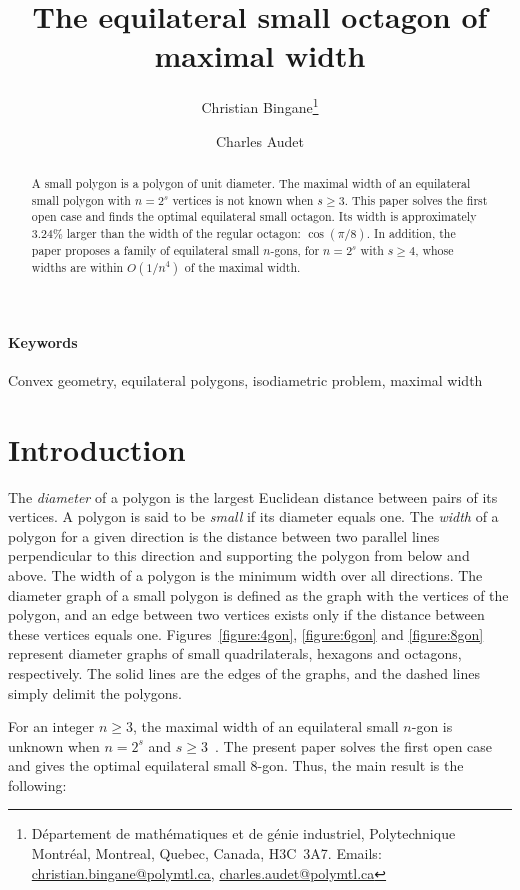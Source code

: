 \documentclass[a4paper,12pt]{article}
\title{The equilateral small octagon of maximal width}
\author{Christian Bingane\thanks{D\'{e}partement de math\'{e}matiques et de g\'{e}nie industriel, Polytechnique Montr\'{e}al, Montreal, Quebec, Canada, H3C~3A7. Emails: \url{christian.bingane@polymtl.ca}, \url{charles.audet@polymtl.ca}} \and Charles Audet\footnotemark[1]}
\theoremstyle{definition}
\theoremstyle{plain}
\begin{document}
\maketitle
\begin{abstract}
A small polygon is a polygon of unit diameter. The maximal width of an equilateral small polygon with $n=2^s$ vertices is not known when $s \ge 3$. This paper solves the first open case and finds the optimal equilateral small octagon. Its width is approximately $3.24\%$ larger than the width of the regular octagon: $\cos(\pi/8)$. In addition, the paper proposes a family of equilateral small $n$-gons, for $n=2^s$ with $s\ge 4$, whose widths are within $O(1/n^4)$ of the maximal width.
\end{abstract}
\paragraph{Keywords} Convex geometry, equilateral polygons, isodiametric problem, maximal width


\section{Introduction}
The {\em diameter} of a polygon is the largest Euclidean distance between pairs of its vertices. A polygon is said to be {\em small} if its diameter equals one. The {\em width}­ of a polygon for a given direction is the distance between two parallel lines perpendicular to this direction and supporting the polygon from below and above. The width of a polygon is the minimum width over all directions. The diameter graph of a small polygon is defined as the graph with the vertices of the polygon, and an edge between two vertices exists only if the distance between these vertices equals one. Figures~\ref{figure:4gon}, \ref{figure:6gon} and \ref{figure:8gon} represent diameter graphs of small quadrilaterals, hexagons and octagons, respectively. The solid lines are the edges of the graphs, and the dashed lines simply delimit the polygons.

For an integer $n \ge 3$, the maximal width of an equilateral small $n$-gon is unknown when $n = 2^s$ and $s \ge 3$~\cite{bezdek2000}. The present paper solves the first open case and gives the optimal equilateral small $8$-gon. Thus, the main result is the following:
\end{document}
